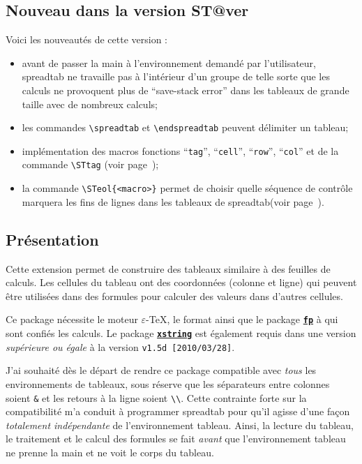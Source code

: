 \documentclass[a4paper,10pt]{article}
\newcommand\verbinline[1][]{\lstinline[breaklines=false,basicstyle=\normalsize\ttfamily,#1]}
\newcommand\ST{\textsf{spreadtab}\xspace}
\begin{document}
\subsection{Nouveau dans la version \csname ST@ver\endcsname}
Voici les nouveautés de cette version :
\begin{itemize}
	\item avant de passer la main à l'environnement demandé par l'utilisateur, \ST ne travaille pas à l'intérieur d'un groupe de telle sorte que les calculs ne provoquent plus de ``save-stack error'' dans les tableaux de grande taille avec de nombreux calculs;
	\item les commandes \verbinline-\spreadtab- et \verbinline-\endspreadtab- peuvent délimiter un tableau;
	\item implémentation des macros fonctions ``\verbinline-tag-'', ``\verbinline-cell-'', ``\verbinline-row-'', ``\verbinline-col-'' et de la commande \verbinline-\STtag- (voir page~\pageref{tag});
	\item la commande \verbinline-\STeol{<macro>}- permet de choisir quelle séquence de contrôle marquera les fins de lignes dans les tableaux de \ST (voir page~\pageref{STeol}).
\end{itemize}

\subsection{Présentation}
Cette extension permet de construire des tableaux similaire à des feuilles de calculs. Les cellules du tableau ont des coordonnées (colonne et ligne) qui peuvent être utilisées dans des formules pour calculer des valeurs dans d'autres cellules.

Ce package nécessite le moteur $\varepsilon$-\TeX, le format \LaTeXe{} ainsi que le package \href{http://www.ctan.org/tex-archive/macros/latex/contrib/fp/}{\texttt{\textbf{fp}}} à qui sont confiés les calculs. Le package \href{http://www.ctan.org/tex-archive/macros/latex/contrib/xstring/}{\texttt{\textbf{xstring}}} est également requis dans une version \emph{supérieure ou égale} à la version \verb-v1.5d [2010/03/28]-.

J'ai souhaité dès le départ de rendre ce package compatible avec \emph{tous} les environnements de tableaux, sous réserve que les séparateurs entre colonnes soient \og\verb=&=\fg{} et les retours à la ligne soient \og\verb=\\=\fg{}. Cette contrainte forte sur la compatibilité m'a conduit à programmer \ST pour qu'il agisse d'une façon \emph{totalement indépendante} de l'environnement tableau. Ainsi, la lecture du tableau, le traitement et le calcul des formules se fait \emph{avant} que l'environnement tableau ne prenne la main et ne \og voit\fg{} le corps du tableau.
\end{document}

